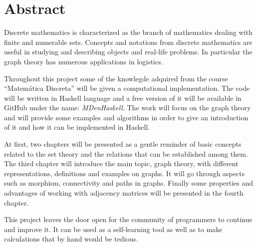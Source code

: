 \chapter*{Abstract}

Discrete mathematics is characterized as the branch of mathematics
dealing with finite and numerable sets. Concepts and notations from
discrete mathematics are useful in studying and describing objects 
and real-life problems. In particular the graph theory has numerous
applications in logistics.


Throughout this project some of the knowlegde adquired from the course
``Matemática Discreta'' will be given a computational implementation.
The code will be written in Haskell language and a free version of it 
will be available in GitHub under the name: \textit{MDenHaskell}.
The work will focus on the graph theory and will provide some
examples and algorithms in order to give an introduction of it and how
it can be implemented in Haskell. 

At first, two chapters will be presented as a gentle reminder of basic
concepts related to the set theory and the relations that can be established
among them. The third chapter will introduce the main topic, graph theory,
with different representations, definitions and examples on graphs. It will
go through aspects such as morphism, connectivity and paths in graphs. Finally
some properties and advantages of working with adjacency matrices will be 
presented in the fourth chapter.

This project leaves the door open for the community of programmers
to continue and improve it. It can be used as a self-learning tool
as well as to make calculations that by hand would be tedious.
